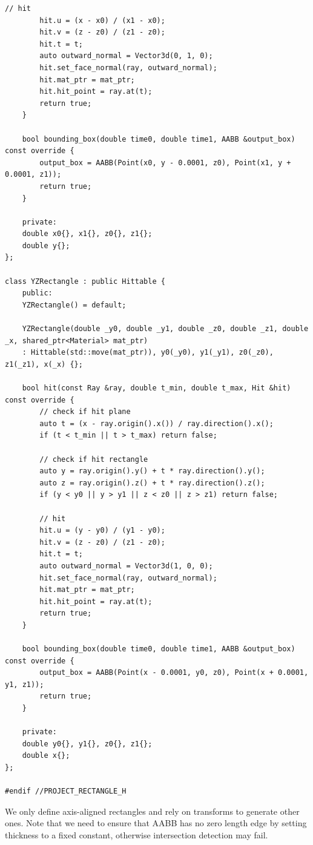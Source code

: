 \documentclass[utf8]{article}
\begin{document}
\begin{lstlisting}[style=CStyle]
		// hit
		hit.u = (x - x0) / (x1 - x0);
		hit.v = (z - z0) / (z1 - z0);
		hit.t = t;
		auto outward_normal = Vector3d(0, 1, 0);
		hit.set_face_normal(ray, outward_normal);
		hit.mat_ptr = mat_ptr;
		hit.hit_point = ray.at(t);
		return true;
	}
	
	bool bounding_box(double time0, double time1, AABB &output_box) const override {
		output_box = AABB(Point(x0, y - 0.0001, z0), Point(x1, y + 0.0001, z1));
		return true;
	}
	
	private:
	double x0{}, x1{}, z0{}, z1{};
	double y{};
};

class YZRectangle : public Hittable {
	public:
	YZRectangle() = default;
	
	YZRectangle(double _y0, double _y1, double _z0, double _z1, double _x, shared_ptr<Material> mat_ptr)
	: Hittable(std::move(mat_ptr)), y0(_y0), y1(_y1), z0(_z0), z1(_z1), x(_x) {};
	
	bool hit(const Ray &ray, double t_min, double t_max, Hit &hit) const override {
		// check if hit plane
		auto t = (x - ray.origin().x()) / ray.direction().x();
		if (t < t_min || t > t_max) return false;
		
		// check if hit rectangle
		auto y = ray.origin().y() + t * ray.direction().y();
		auto z = ray.origin().z() + t * ray.direction().z();
		if (y < y0 || y > y1 || z < z0 || z > z1) return false;
		
		// hit
		hit.u = (y - y0) / (y1 - y0);
		hit.v = (z - z0) / (z1 - z0);
		hit.t = t;
		auto outward_normal = Vector3d(1, 0, 0);
		hit.set_face_normal(ray, outward_normal);
		hit.mat_ptr = mat_ptr;
		hit.hit_point = ray.at(t);
		return true;
	}
	
	bool bounding_box(double time0, double time1, AABB &output_box) const override {
		output_box = AABB(Point(x - 0.0001, y0, z0), Point(x + 0.0001, y1, z1));
		return true;
	}
	
	private:
	double y0{}, y1{}, z0{}, z1{};
	double x{};
};

#endif //PROJECT_RECTANGLE_H

\end{lstlisting}
We only define axis-aligned rectangles and rely on transforms to generate other ones. Note that we need to ensure that AABB has no zero length edge by setting thickness to a fixed constant, otherwise intersection detection may fail. 
\end{document}
